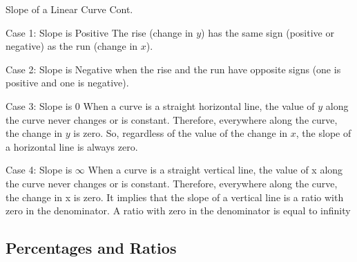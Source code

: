 \documentclass{beamer}
\begin{document}
\begin{frame}{Slope of a Linear Curve Cont.}

\begin{block}{Case 1: Slope is Positive}
The rise (change in $y$) has the same sign (positive or negative) as the run (change in $x$).   
\end{block}

\begin{block}{Case 2: Slope is Negative}
when the rise and the run have opposite signs (one is positive and one is negative).   
\end{block}

\begin{block}{Case 3: Slope is 0}
When a curve is a straight horizontal line, the value of $y$ along the curve never changes or is constant. Therefore, everywhere along the curve, the change in $y$ is zero. So, regardless of the value of the change in $x$, the slope of a horizontal line is always zero.   
\end{block}

\end{frame}

\begin{frame}
\begin{block}{Case 4: Slope is $\infty$}
When a curve is a straight vertical line, the value of x along the curve never changes or is constant. Therefore, everywhere along the curve, the change in x is zero. It implies that the slope of a vertical line is a ratio with zero in the denominator. A ratio with zero in the denominator is equal to infinity
\end{block}
\end{frame}

\subsection{Percentages and Ratios}
\end{document}
